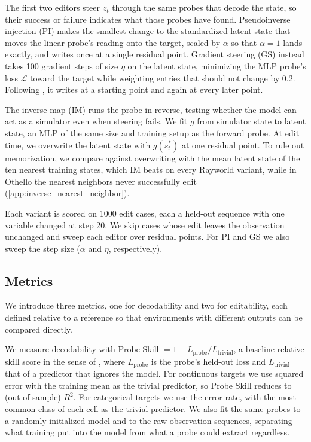 \documentclass{article} %
\begin{document}
The first two editors steer $z_t$ through the same probes that decode the state, so their success or failure indicates what those probes have found. Pseudoinverse injection (PI) makes the smallest change to the standardized latent state that moves the linear probe's reading onto the target, scaled by $\alpha$ so that $\alpha = 1$ lands exactly, and writes once at a single residual point. Gradient steering (GS) instead takes 100 gradient steps of size $\eta$ on the latent state, minimizing the MLP probe's loss $\mathcal{L}$ toward the target while weighting entries that should not change by $0.2$. Following \citet{li2023othello}, it writes at a starting point and again at every later point.


The inverse map (IM) runs the probe in reverse, testing whether the model can act as a simulator even when steering fails. We fit $g$ from simulator state to latent state, an MLP of the same size and training setup as the forward probe. At edit time, we overwrite the latent state with $g(s_t^*)$ at one residual point. To rule out memorization, we compare against overwriting with the mean latent state of the ten nearest training states, which IM beats on every Rayworld variant, while in Othello the nearest neighbors never successfully edit (\cref{app:inverse_nearest_neighbor}).

Each variant is scored on 1000 edit cases, each a held-out sequence with one variable changed at step 20. We skip cases whose edit leaves the observation unchanged and sweep each editor over residual points. For PI and GS we also sweep the step size ($\alpha$ and $\eta$, respectively).

\subsection{Metrics}
We introduce three metrics, one for decodability and two for editability, each defined relative to a reference so that environments with different outputs can be compared directly.

We measure decodability with Probe Skill $= 1 - L_{\mathrm{probe}} / L_{\mathrm{trivial}}$, a baseline-relative skill score in the sense of \citet{murphy1988skill}, where $L_{\mathrm{probe}}$ is the probe's held-out loss and $L_{\mathrm{trivial}}$ that of a predictor that ignores the model. For continuous targets we use squared error with the training mean as the trivial predictor, so Probe Skill reduces to (out-of-sample) $R^2$. For categorical targets we use the error rate, with the most common class of each cell as the trivial predictor. We also fit the same probes to a randomly initialized model \citep{li2023othello} and to the raw observation sequences, separating what training put into the model from what a probe could extract regardless.
\end{document}
